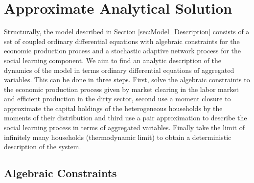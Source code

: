 \section{Approximate Analytical Solution}

Structurally, the model described in Section \ref{sec:Model_Description} consists of a set of coupled ordinary differential equations with algebraic constraints for the economic production process and a stochastic adaptive network process for the social learning component.
We aim to find an analytic description of the dynamics of the model in terms ordinary differential equations of aggregated variables. This can be done in three steps. First, solve the algebraic constraints to the economic production process given by market clearing in the labor market and efficient production in the dirty sector, second use a moment closure to approximate the capital holdings of the heterogeneous households by the moments of their distribution and third use a pair approximation to describe the social learning process in terms of aggregated variables. Finally take the limit of infinitely many households (thermodynamic limit) to obtain a deterministic description of the system.

\subsection{Algebraic Constraints}

